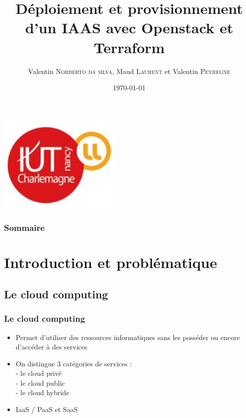\documentclass[11pt]{beamer} %
\title[Projet Tutoré]{Déploiement et provisionnement d’un IAAS avec Openstack et Terraform}
\author{Valentin \textsc{Norberto da silva}, Maud \textsc{Laurent} et Valentin \textsc{Peyregne}}
\institute{IUT Nancy Charlemagne}
\date{\today}
\begin{document}
	
		\begin{frame}
			\titlepage
			\begin{flushright}
				\includegraphics[scale=0.3]{logo.png}
			\end{flushright}
		\end{frame}


		\begin{frame}
			\transdissolve[duration=2]
			\frametitle{Sommaire}
			\tableofcontents%
		\end{frame}


	\section{Introduction et problématique}
		
		
		\subsection{Le cloud computing}
			\begin{frame}
				\frametitle{Le cloud computing}
				\begin{itemize}
					\item Permet d'utiliser des ressources informatiques sans les posséder ou encore d'accéder à des services
					\item On distingue 3 catégories de services :\\
						- le cloud privé \\
						- le cloud public \\
						- le cloud hybride \\
					\item IaaS / PaaS et SaaS
				\end{itemize}
			\end{frame}

		
\end{document}
